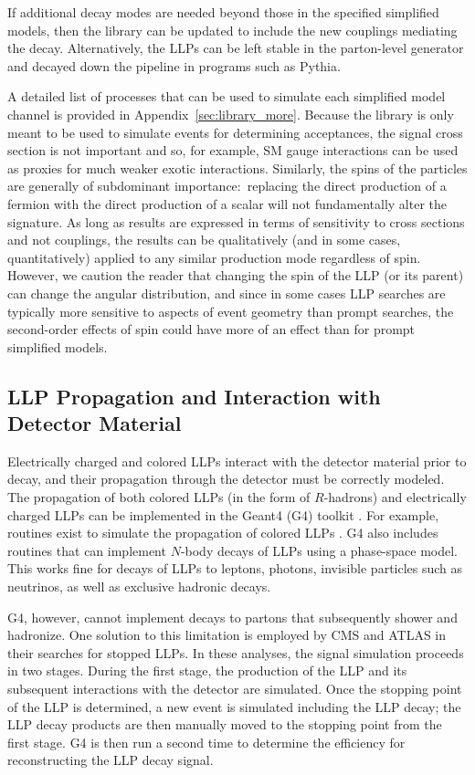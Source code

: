 %
If additional decay modes are needed beyond those in the specified simplified models, then the library can be updated to include the new couplings mediating the decay. Alternatively, the LLPs can be left stable in the parton-level generator and decayed down the pipeline in programs such as Pythia.

A detailed list of processes that can be used to simulate each simplified model channel is provided in Appendix~\ref{sec:library_more}. Because the library is only meant to be used to simulate events for determining acceptances, the signal cross section is not important and so, for example, SM gauge interactions can be used as proxies for much weaker exotic interactions. Similarly, the spins of the particles are generally of subdominant importance:~replacing the direct production of a fermion with the direct production of a scalar will not fundamentally alter the signature. As long as results are expressed in terms of sensitivity to cross sections and not couplings, the results can be qualitatively (and in some cases, quantitatively) applied to any similar production mode regardless of spin. However, we caution the reader that changing the spin of the LLP (or its parent) can change the angular distribution, and since in some cases LLP searches are typically more sensitive to aspects of event geometry than prompt searches, the second-order effects of spin could have more of an effect than for prompt simplified models.

\subsection{LLP Propagation and Interaction with Detector Material}\label{sec:geant}

Electrically charged and colored LLPs interact with the detector material prior to decay, and their propagation through the detector must be correctly modeled. The propagation of both colored LLPs (in the form of $R$-hadrons) and electrically charged LLPs can be implemented in the Geant4 (G4) toolkit \cite{Agostinelli:2002hh}. For example, routines exist to simulate the propagation of colored LLPs \cite{Mackeprang:2006gx,Mackeprang:2009ad}. G4 also includes routines that can implement $N$-body decays of LLPs using a phase-space model. This works fine for decays of LLPs to leptons, photons, invisible particles such as neutrinos, as well as exclusive hadronic decays. 

G4, however, cannot implement decays to partons that subsequently shower and hadronize. One solution to this limitation is employed by CMS \cite{Khachatryan:2015jha,Sirunyan:2017sbs} and ATLAS \cite{Aad:2013gva} in their searches for stopped LLPs. In these analyses, the signal simulation proceeds in two stages. During the first stage, the production of the LLP and its subsequent interactions with the detector are simulated. Once the stopping point of the LLP is determined, a new event is simulated including the LLP decay;  the LLP decay products are then manually moved to the stopping point from the first stage. G4 is then run a second time to determine the efficiency for reconstructing the LLP decay signal.

